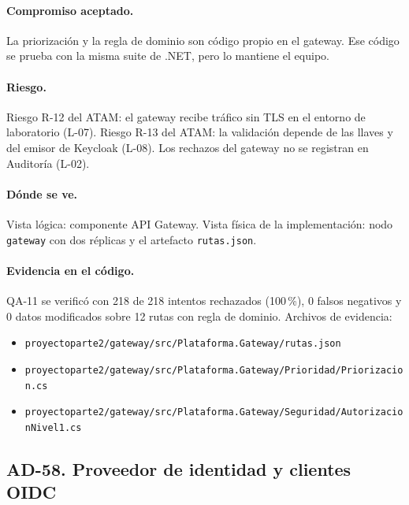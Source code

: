 \paragraph{Compromiso aceptado.} La priorización y la regla de dominio son código propio en el gateway.
Ese código se prueba con la misma suite de .NET, pero lo mantiene el equipo.

\paragraph{Riesgo.} Riesgo R-12 del ATAM: el gateway recibe tráfico sin TLS en el entorno de laboratorio (L-07).
Riesgo R-13 del ATAM: la validación depende de las llaves y del emisor de Keycloak (L-08).
Los rechazos del gateway no se registran en Auditoría (L-02).

\paragraph{Dónde se ve.} Vista lógica: componente API Gateway.
Vista física de la implementación: nodo \texttt{gateway} con dos réplicas y el artefacto \texttt{rutas.json}.

\paragraph{Evidencia en el código.} QA-11 se verificó con 218 de 218 intentos rechazados (100\,\%), 0 falsos negativos y 0 datos modificados sobre 12 rutas con regla de dominio.
Archivos de evidencia:
{\raggedright
\begin{itemize}
  \item \texttt{proyectoparte2/\br{}gateway/\br{}src/\br{}Plataforma.Gateway/\br{}rutas.json}
  \item \texttt{proyectoparte2/\br{}gateway/\br{}src/\br{}Plataforma.Gateway/\br{}Prioridad/\br{}Priorizacion.cs}
  \item \texttt{proyectoparte2/\br{}gateway/\br{}src/\br{}Plataforma.Gateway/\br{}Seguridad/\br{}AutorizacionNivel1.cs}
\end{itemize}
\par}

\subsection{AD-58. Proveedor de identidad y clientes OIDC}
\label{sec:tec-ad58}

